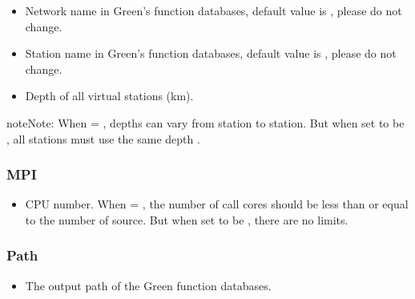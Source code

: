 \documentclass[a4paper,10pt,english,openany]{sphinxmanual}
\begin{document}
\begin{itemize}
\item {} 
Network name in Green’s function databases, default value is , please do not change.

\end{itemize}

\begin{itemize}
\item {} 
Station name in Green’s function databases, default value is , please do not change.

\end{itemize}

\begin{itemize}
\item {} 
Depth of all virtual stations (km).

\end{itemize}

\begin{sphinxadmonition}{note}{Note:}
When  = , depths can vary from station to station. But when set to be ,
all stations must use the same depth .
\end{sphinxadmonition}


\subsubsection{MPI}
\label{\detokenize{tutorials/S1_Build_GFs:mpi}}
\begin{itemize}
\item {} 
CPU number. When  = , the number of call cores should be less than or equal to the number of source.
But when set to be , there are no limits.

\end{itemize}


\subsubsection{Path}
\label{\detokenize{tutorials/S1_Build_GFs:path}}
\begin{itemize}
\item {} 
The output path of the Green function databases.

\end{itemize}
\end{document}
